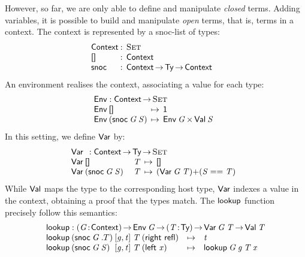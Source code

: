 \newcommand{\Ctxt}{\D{Context}}
\newcommand{\SYMBCtxtEmpty}{\C{[]}\xspace}
\newcommand{\CtxtEmpty}{\SYMBCtxtEmpty}
\newcommand{\SYMBCtxtSnoc}{\C{snoc}\xspace}
\newcommand{\CtxtSnoc}[2]{\SYMBCtxtSnoc\:#1\:#2}
\newcommand{\SYMBEnv}{\F{Env}}
\newcommand{\Env}[1]{\SYMBEnv\: #1}
\newcommand{\SYMBlookup}{\F{lookup}}
\newcommand{\lookup}[4]{\SYMBlookup\: #1\: #2\: #3\: #4}

However, so far, we are only able to define and manipulate
\emph{closed} terms. Adding variables, it is possible to build and
manipulate \emph{open} terms, that is, terms in a context. The context
is represented by a snoc-list of types:
%
\[
\begin{array}{@{}l@{\::\:\:}l@{\quad}l}
\Ctxt           & \Set \\
\SYMBCtxtEmpty  & \Ctxt \\
\SYMBCtxtSnoc   & \Ctxt \To \Ty \To \Ctxt
\end{array}
\]
%
An environment realises the context, associating a value for each type:
%
\[
\stk{
\SYMBEnv : \Ctxt \To \Set \\
\begin{array}{@{}l@{\:\:\mapsto\:\:}l}
\Env{\CtxtEmpty}                & \Unit \\
\Env{(\CtxtSnoc{\V{G}}{\V{S}})} & \TIMES{\Env{\V{G}}}{\Val{\V{S}}}
\end{array}
}\]
%
In this setting, we define $\SYMBVar$ by:
%
\[\stk{
\Var{}{} : \Ctxt \To \Ty \To \Set \\
\begin{array}{@{}ll@{\:\:\mapsto\:\:}l}
\Var{\CtxtEmpty}{& \V{T}}                & 
    \Void \\
\Var{(\CtxtSnoc{\V{G}}{\V{S}})}{& \V{T}} & 
    \SUM{(\Var{\V{G}}{\V{T}})}{(\V{S} \PropEq \V{T})}
\end{array}
}\]
%
While $\SYMBVal$ maps the type to the corresponding host type,
$\SYMBVar$ indexes a value in the context, obtaining a proof that the
types match. The $\SYMBlookup$ function precisely follow this
semantics:
%
\[\stk{
\SYMBlookup : \PI{\V{G}}{\Ctxt} 
          \Env{\V{G}} \To 
          \PI{\V{T}}{\Ty} 
          \Var{\V{G}}{\V{T}} \To
          \Val{\V{T}} \\
\begin{array}{@{}l@{}l@{}l@{}l@{}lll}
\lookup{& (\CtxtSnoc{\V{G}}{.T})}{& \pair{\V{g}}{\V{t}}{}}{& \V{T}}{& (\SumRight{\C{refl}})} & \mapsto & \V{t} \\
\lookup{& (\CtxtSnoc{\V{G}}{\V{S}})}{& \pair{\V{g}}{\V{t}}{}}{& \V{T}}{& (\SumLeft{\V{x}})} & \mapsto & \lookup{\V{G}}{\V{g}}{\V{T}}{\V{x}} 
\end{array}
}\]

